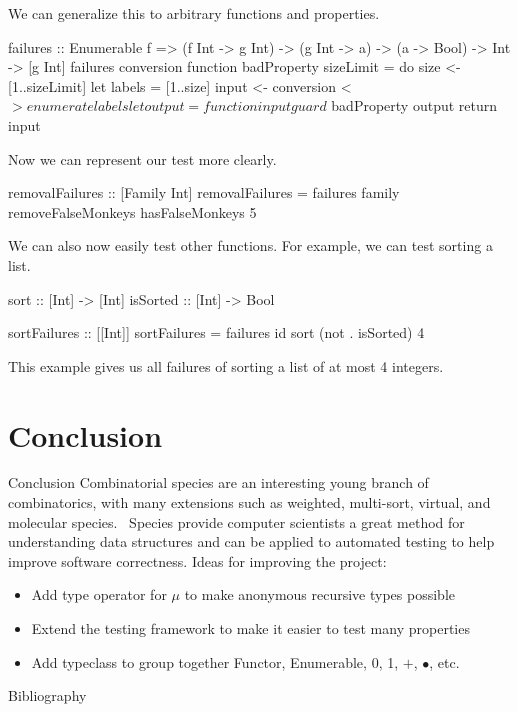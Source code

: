 \documentclass{beamer}
\begin{document}
\begin{frame}[fragile]
  We can generalize this to arbitrary functions and properties.
  \begin{code}
failures :: Enumerable f
         => (f Int -> g Int)
         -> (g Int -> a)
         -> (a -> Bool)
         -> Int
         -> [g Int]
failures conversion function badProperty sizeLimit = do
  size <- [1..sizeLimit]
  let labels = [1..size]
  input <- conversion <$> enumerate labels
  let output = function input
  guard $ badProperty output
  return input
  \end{code}
  \vfill
  Now we can represent our test more clearly.
  \begin{code}
removalFailures :: [Family Int]
removalFailures = failures family removeFalseMonkeys hasFalseMonkeys 5
  \end{code}
\end{frame}
\begin{frame}[fragile]
  We can also now easily test other functions. For example, we can test sorting a list.
  \begin{code}
sort :: [Int] -> [Int]
isSorted :: [Int] -> Bool

sortFailures :: [[Int]]
sortFailures = failures id sort (not . isSorted) 4
  \end{code}
  This example gives us all failures of sorting a list of at most 4 integers.
\end{frame}

\section{Conclusion}
\begin{frame}{Conclusion}
  Combinatorial species are an interesting young branch of combinatorics, with many extensions such
  as weighted, multi-sort, virtual, and molecular species.~\cite{yorgey} Species provide computer
  scientists a great method for understanding data structures and can be applied to automated
  testing to help improve software correctness.
  \vfill
  Ideas for improving the project:
  \begin{itemize}
    \item Add type operator for \( \mu \) to make anonymous recursive types possible
    \item Extend the testing framework to make it easier to test many properties
    \item Add typeclass to group together Functor, Enumerable, 0, 1, \( + \), \( \bullet \), etc.
  \end{itemize}
\end{frame}

\begin{frame}{Bibliography}
  \printbibliography{}
\end{frame}
\end{document}
